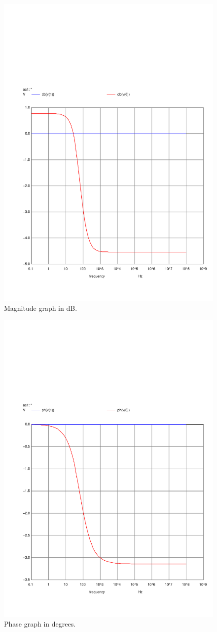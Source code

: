 \begin{figure}[H] \centering
    \includegraphics[width=0.9\linewidth]{../Simulation/acm_db.pdf}
    \caption{Magnitude graph in dB.}
    \label{fig:FreqMagDBNg}
\end{figure}

\begin{figure}[H] \centering
    \includegraphics[width=0.9\linewidth]{../Simulation/acph.pdf}
    \caption{Phase graph in degrees.}
    \label{fig:FreqPhNg}
\end{figure}
